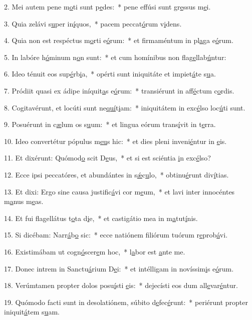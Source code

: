 2. Mei autem pene m\uline{o}ti sunt p\uline{e}des:~* pene effúsi sunt gr\uline{e}ssus m\uline{e}i.\par 
3. Quia zelávi s\uline{u}per in\uline{í}quos,~* pacem peccat\uline{ó}rum v\uline{i}dens.\par 
4. Quia non est respéctus m\uline{o}rti e\uline{ó}rum:~* et firmaméntum in pl\uline{a}ga e\uline{ó}rum.\par 
5. In labóre h\uline{ó}minum n\uline{o}n sunt:~* et cum homínibus non flag\uline{e}llab\uline{ú}ntur:\par 
6. Ideo ténuit eos sup\uline{é}rb\uline{i}a,~* opérti sunt iniquitáte et impiet\uline{á}te s\uline{u}a.\par 
7. Pródiit quasi ex ádipe iníquit\uline{a}s e\uline{ó}rum:~* transiérunt in aff\uline{é}ctum c\uline{o}rdis.\par 
8. Cogitavérunt, et locúti sunt ne\uline{quí}t\uline{i}am:~* iniquitátem in exc\uline{é}lso loc\uline{ú}ti sunt.\par 
9. Posuérunt in c\uline{æ}lum os s\uline{u}um:~* et lingua eórum trans\uline{í}vit in t\uline{e}rra.\par 
10. Ideo convertétur pópulus m\uline{e}\uline{u}s hic:~* et dies pleni inveni\uline{é}ntur in \uline{e}is.\par 
11. Et dixérunt: Quómod\uline{o} scit D\uline{e}us,~* et si est sciéntia \uline{i}n exc\uline{é}lso?\par 
12. Ecce ipsi peccatóres, et abundántes in s\uline{ǽ}c\uline{u}lo,~* obtinu\uline{é}runt div\uline{í}tias.\par 
13. Et dixi: Ergo sine causa justific\uline{á}vi cor m\uline{e}um,~* et lavi inter innocéntes m\uline{a}nus m\uline{e}as.\par 
14. Et fui flagellátus t\uline{o}ta d\uline{i}e,~* et castigátio mea in m\uline{a}tut\uline{í}nis.\par 
15. Si dicébam: Narr\uline{á}b\uline{o} sic:~* ecce natiónem filiórum tuórum r\uline{e}prob\uline{á}vi.\par 
16. Existimábam ut cogn\uline{ó}scer\uline{e}m hoc,~* l\uline{a}bor est \uline{a}nte me.\par 
17. Donec intrem in Sanctu\uline{á}rium D\uline{e}i:~* et intélligam in novíssim\uline{i}s e\uline{ó}rum.\par 
18. Verúmtamen propter dolos posu\uline{í}sti \uline{e}is:~* dejecísti eos dum all\uline{e}var\uline{é}ntur.\par 
19. Quómodo facti sunt in desolatiónem, súbito d\uline{e}fec\uline{é}runt:~* periérunt propter iniquit\uline{á}tem s\uline{u}am.\par 
